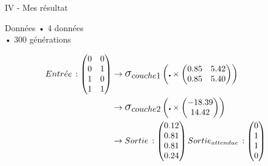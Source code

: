 \begin{frame}{IV - Mes résultat}
	\begin{block}{Données}
		• 4 données \\
		• 300 générations
	\end{block}
	\begin{align*}
		Entr\acute{e} e\, :
		\begin{pmatrix}
			0 & 0 \\
			0 & 1 \\
			1 & 0 \\
			1 & 1
		\end{pmatrix}
		 & \to
		\mathlarger{\mathlarger{\sigma_{couche1}}}
		\left( \centerdot \times
		\begin{pmatrix}
				0.85 & 5.42 \\
				0.85 & 5.40 
			\end{pmatrix}
		\right) \\
		 & \to
		\mathlarger{\mathlarger{\sigma_{couche2}}}
		\left( \centerdot \times
		\begin{pmatrix}
				-18.39 \\
				14.42  
			\end{pmatrix}
		\right) \\
		 & \to
		Sortie\, :
		\begin{pmatrix}
			0.12 \\
			0.81 \\
			0.81 \\
			0.24
		\end{pmatrix}
		Sortie_{attendue}\, :
		\begin{pmatrix}
			0 \\
			1 \\
			1 \\
			0
		\end{pmatrix}
	\end{align*}
\end{frame}